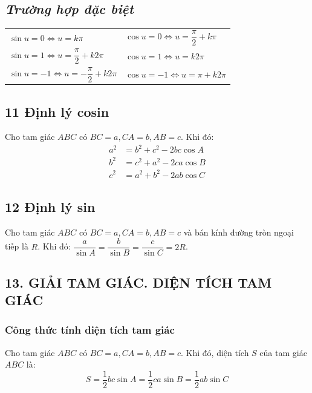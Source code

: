 \documentclass[12pt,a4paper]{extarticle}
\begin{document}
\subsection*{\textit{Trường hợp đặc biệt}}
\begin{center}
\renewcommand{\arraystretch}{2.2}
\begin{tabular}{l | l}
    $\sin u = 0 \Leftrightarrow u = k\pi$ & $\cos u = 0 \Leftrightarrow u = \dfrac{\pi}{2} + k\pi$ \\
    
    $\sin u = 1 \Leftrightarrow u = \dfrac{\pi}{2} + k2\pi$ & $\cos u = 1 \Leftrightarrow u = k2\pi$ \\
    
    $\sin u = -1 \Leftrightarrow u = -\dfrac{\pi}{2} + k2\pi$ \qquad & $\cos u = -1 \Leftrightarrow u = \pi + k2\pi$
\end{tabular}
\end{center}
\subsection*{\textcolor{bookmagenta}{11 Định lý cosin}}
\begin{formulaBox}
Cho tam giác $ABC$ có $BC = a, CA = b, AB = c$. Khi đó:
\[\begin{aligned}
    a^2 &= b^2 + c^2 - 2bc \cos A \\
    b^2 &= c^2 + a^2 - 2ca \cos B \\
    c^2 &= a^2 + b^2 - 2ab \cos C
\end{aligned}\]
\end{formulaBox}
\subsection*{\textcolor{bookmagenta}{12 Định lý sin}}
\begin{formulaBox}
Cho tam giác $ABC$ có $BC = a, CA = b, AB = c$ và bán kính đường tròn ngoại tiếp là $R$.
Khi đó: $\dfrac{a}{\sin A} = \dfrac{b}{\sin B} = \dfrac{c}{\sin C} = 2R$.
\end{formulaBox}
\vspace{0.5cm}
\subsection*{\textcolor{bookmagenta}{13. GIẢI TAM GIÁC. DIỆN TÍCH TAM GIÁC}}
\subsubsection*{\textcolor{bookmagenta}{Công thức tính diện tích tam giác}}
\begin{formulaBox}
Cho tam giác $ABC$ có $BC = a, CA = b, AB = c$. Khi đó, diện tích $S$ của tam giác $ABC$ là:
\[
S = \frac{1}{2} bc \sin A = \frac{1}{2} ca \sin B = \frac{1}{2} ab \sin C
\]
\end{formulaBox}
\end{document}
